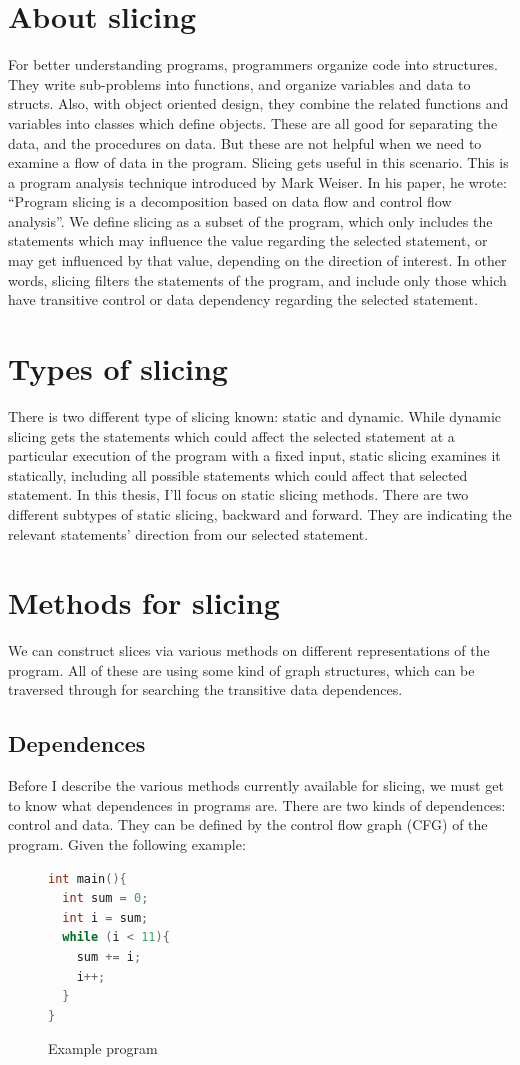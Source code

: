 \documentclass[oneside,12pt,a4paper]{book}
\begin{document}
\section{About slicing}
For better understanding programs, programmers organize code into structures. They write sub-problems into functions, and organize variables and data to structs. Also, with object oriented design, they combine the related functions and variables into classes which define objects. These are all good for separating the data, and the procedures on data. But these are not helpful when we need to examine a flow of data in the program. Slicing gets useful in this scenario. This is a program analysis technique introduced by Mark Weiser\cite{weiser84}. In his paper, he wrote: ``Program slicing is a decomposition based on data flow and control flow analysis''. We define slicing as a subset of the program, which only includes the statements which may influence the value regarding the selected statement, or may get influenced by that value, depending on the direction of interest. In other words, slicing filters the statements of the program, and include only those which have transitive control or data dependency regarding the selected statement. 

\section{Types of slicing}
There is two different type of slicing known: static and dynamic. While dynamic slicing gets the statements which could affect the selected statement at a particular execution of the program with a fixed input, static slicing examines it statically, including all possible statements which could affect that selected statement. In this thesis, I'll focus on static slicing methods. There are two different subtypes of static slicing, backward and forward. They are indicating the relevant statements' direction from our selected statement. 

\section{Methods for slicing}
We can construct slices via various methods on different representations of the program. All of these are using some kind of graph structures, which can be traversed through for searching the transitive data dependences.

\subsection{Dependences}
Before I describe the various methods currently available for slicing, we must get to know what dependences in programs are. There are two kinds of dependences: control and data. They can be defined by the control flow graph (CFG) of the program. Given the following example:
\begin{figure}[h]
\begin{lstlisting}[language=C++]
int main(){
  int sum = 0;
  int i = sum;
  while (i < 11){
    sum += i;
    i++;
  }
}
\end{lstlisting}
\caption{Example program}
\label{fig:example_prog}
\end{figure}
\end{document}
